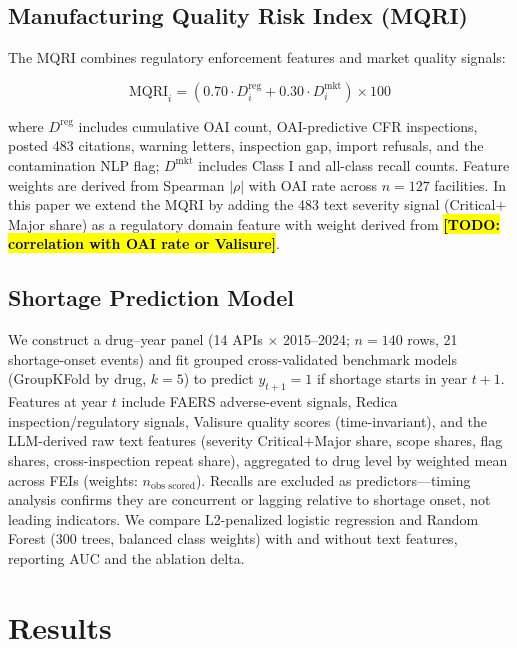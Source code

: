 \documentclass[12pt]{article}
\newcommand{\todo}[1]{\hl{\textbf{[TODO: #1]}}}
\begin{document}
\subsection{Manufacturing Quality Risk Index (MQRI)}

The MQRI combines regulatory enforcement features and market quality signals:

\begin{equation}
  \text{MQRI}_i = \left( 0.70 \cdot D^{\text{reg}}_i
                         + 0.30 \cdot D^{\text{mkt}}_i \right) \times 100
\end{equation}

where $D^{\text{reg}}$ includes cumulative OAI count, OAI-predictive CFR
inspections, posted 483 citations, warning letters, inspection gap, import
refusals, and the contamination NLP flag; $D^{\text{mkt}}$ includes Class I
and all-class recall counts.
Feature weights are derived from Spearman $|\rho|$ with OAI rate across
$n = 127$ facilities.
In this paper we extend the MQRI by adding the 483 text severity signal
(Critical$+$Major share) as a regulatory domain feature with weight derived
from \todo{correlation with OAI rate or Valisure}.

\subsection{Shortage Prediction Model}

We construct a drug--year panel (14 APIs $\times$ 2015--2024; $n=140$ rows,
21 shortage-onset events) and fit grouped cross-validated benchmark models
(GroupKFold by drug, $k=5$) to predict $y_{t+1} = 1$ if shortage starts in
year $t+1$.
Features at year $t$ include FAERS adverse-event signals, Redica
inspection/regulatory signals, Valisure quality scores (time-invariant), and
the LLM-derived raw text features (severity Critical$+$Major share, scope
shares, flag shares, cross-inspection repeat share), aggregated to
drug level by weighted mean across FEIs (weights: $n_{\text{obs scored}}$).
Recalls are excluded as predictors---timing analysis confirms they are
concurrent or lagging relative to shortage onset, not leading indicators.
We compare L2-penalized logistic regression and Random Forest (300 trees,
balanced class weights) with and without text features, reporting AUC and
the ablation delta.

\section{Results}
\label{sec:results}
\end{document}
